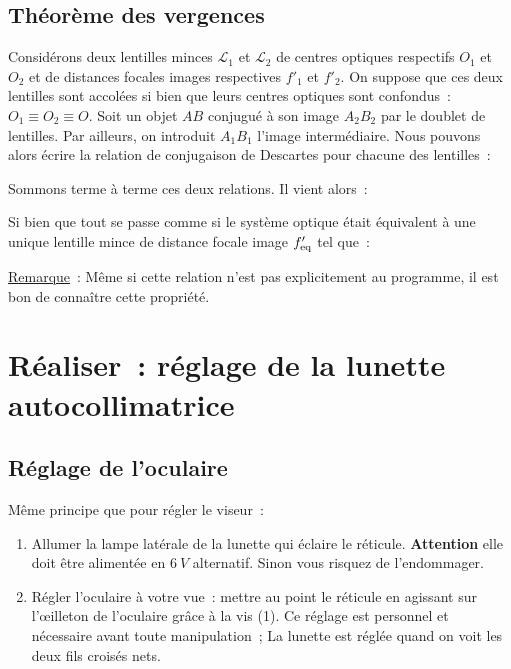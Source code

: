 \documentclass[a4paper, 12pt, final, garamond]{book}
\begin{document}
\vspace{2cm}

\subsection{Théorème des vergences}

Considérons deux lentilles minces $\mathcal{L}_1$ et $\mathcal{L}_2$ de centres
optiques respectifs $O_1$ et $O_2$ et de distances focales images respectives
$f'_1$ et $f'_2$. On suppose que ces deux lentilles sont accolées si bien que
leurs centres optiques sont confondus~: $O_1 \equiv O_2 \equiv O$. Soit un objet
$AB$ conjugué à son image $A_2B_2$ par le doublet de lentilles. Par ailleurs, on
introduit $A_1B_1$ l'image intermédiaire. Nous pouvons alors écrire la relation
de conjugaison de Descartes pour chacune des lentilles~: 


Sommons terme à terme ces deux relations. Il vient alors~: 


Si bien que tout se passe comme si le système optique était équivalent à une
unique lentille mince de distance focale image $f'_{\rm eq}$ tel que~: 



\underline{Remarque}~: Même si cette relation n'est pas explicitement au
programme, il est bon de connaître cette propriété. 

\section{Réaliser~: réglage de la lunette autocollimatrice}

\subsection{Réglage de l'oculaire}

Même principe que pour régler le viseur~:

\begin{enumerate}
    \item Allumer la lampe latérale de la lunette qui éclaire le réticule.
        \textbf{Attention} elle doit être alimentée en $\SI{6}{V}$ alternatif.
        Sinon vous risquez de l'endommager.
    \item Régler l'oculaire à votre vue~: mettre au point le réticule en
        agissant sur l'œilleton de l'oculaire grâce à la vis (1). Ce réglage est
        personnel et nécessaire avant toute manipulation~; La lunette est réglée
        quand on voit les deux fils croisés nets.
\end{enumerate}
\end{document}
